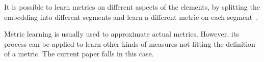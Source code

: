 It is possible to learn metrics on different aspects of the elements, by splitting the embedding into different segments and learn a different metric on each segment~\cite{deep-metric-multispeaker:2020:kulkarni}.

Metric learning is usually used to approximate actual metrics.
However, its process can be applied to learn other kinds of measures not fitting the definition of a metric.
The current paper falls in this case.